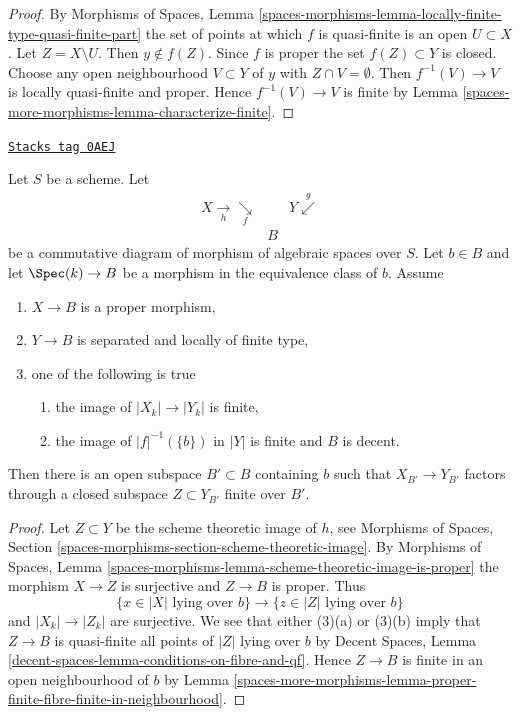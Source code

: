 \begin{proof}
By
Morphisms of Spaces, Lemma
\ref{spaces-morphisms-lemma-locally-finite-type-quasi-finite-part} the
set of points at which $f$ is quasi-finite is an open $U \subset X$.
Let $Z = X \setminus U$. Then $y \not \in f(Z)$. Since $f$ is proper
the set $f(Z) \subset Y$ is closed. Choose any open neighbourhood
$V \subset Y$ of $y$ with $Z \cap V = \emptyset$. Then
$f^{-1}(V) \to V$ is locally quasi-finite and proper.
Hence $f^{-1}(V) \to V$ is finite by Lemma \ref{spaces-more-morphisms-lemma-characterize-finite}.
\end{proof}

\begin{lemma}
\label{spaces-more-morphisms-lemma-flat-proper-family-cannot-collapse-fibre}
\href{https://stacks.math.columbia.edu/tag/0AEJ}{\texttt{Stacks tag 0AEJ}}


Let $S$ be a scheme. Let
$$
\begin{array}{ccc}X \underset{h}{\longrightarrow}\underset{f}{\searrow} &  & Y \overset{g}{\swarrow} \\  & B & \end{array}
$$
be a commutative diagram of morphism of algebraic spaces over $S$.
Let $b \in B$ and let $\Spec(k) \to B$ be a morphism in the equivalence
class of $b$. Assume
\begin{enumerate}
\item $X \to B$ is a proper morphism,
\item $Y \to B$ is separated and locally of finite type,
\item one of the following is true
\begin{enumerate}
\item the image of $|X_k| \to |Y_k|$ is finite,
\item the image of $|f|^{-1}(\{b\})$ in $|Y|$ is finite
and $B$ is decent.
\end{enumerate}
\end{enumerate}
Then there is an open
subspace $B' \subset B$ containing $b$ such that $X_{B'} \to Y_{B'}$
factors through a closed subspace $Z \subset Y_{B'}$ finite over $B'$.
\end{lemma}

\begin{proof}
Let $Z \subset Y$ be the scheme theoretic image of $h$, see
Morphisms of Spaces, Section
\ref{spaces-morphisms-section-scheme-theoretic-image}.
By Morphisms of Spaces, Lemma
\ref{spaces-morphisms-lemma-scheme-theoretic-image-is-proper}
the morphism $X \to Z$ is surjective and $Z \to B$ is proper.
Thus
$$
\{x \in |X|\text{ lying over }b\} \to
\{z \in |Z|\text{ lying over }b\}
$$
and $|X_k| \to |Z_k|$ are surjective. We see that either
(3)(a) or (3)(b) imply that $Z \to B$ is quasi-finite
all points of $|Z|$ lying over $b$ by
Decent Spaces, Lemma \ref{decent-spaces-lemma-conditions-on-fibre-and-qf}.
Hence $Z \to B$ is finite in an open neighbourhood of $b$ by
Lemma \ref{spaces-more-morphisms-lemma-proper-finite-fibre-finite-in-neighbourhood}.
\end{proof}

